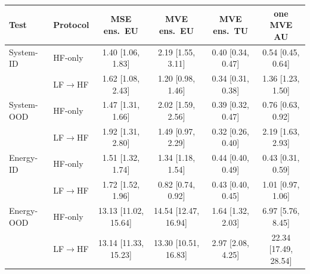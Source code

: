 \begin{tabular}{llcccc}
\toprule
Test & Protocol & MSE ens.\ EU & MVE ens.\ EU & MVE ens.\ TU & one MVE AU \\
\midrule
System-ID & HF-only & 1.40 {\scriptsize [1.06, 1.83]} & 2.19 {\scriptsize [1.55, 3.11]} & 0.40 {\scriptsize [0.34, 0.47]} & 0.54 {\scriptsize [0.45, 0.64]} \\
 & LF$\to$HF & 1.62 {\scriptsize [1.08, 2.43]} & 1.20 {\scriptsize [0.98, 1.46]} & 0.34 {\scriptsize [0.31, 0.38]} & 1.36 {\scriptsize [1.23, 1.50]} \\
\addlinespace
System-OOD & HF-only & 1.47 {\scriptsize [1.31, 1.66]} & 2.02 {\scriptsize [1.59, 2.56]} & 0.39 {\scriptsize [0.32, 0.47]} & 0.76 {\scriptsize [0.63, 0.92]} \\
 & LF$\to$HF & 1.92 {\scriptsize [1.31, 2.80]} & 1.49 {\scriptsize [0.97, 2.29]} & 0.32 {\scriptsize [0.26, 0.40]} & 2.19 {\scriptsize [1.63, 2.93]} \\
\addlinespace
Energy-ID & HF-only & 1.51 {\scriptsize [1.32, 1.74]} & 1.34 {\scriptsize [1.18, 1.54]} & 0.44 {\scriptsize [0.40, 0.49]} & 0.43 {\scriptsize [0.31, 0.59]} \\
 & LF$\to$HF & 1.72 {\scriptsize [1.52, 1.96]} & 0.82 {\scriptsize [0.74, 0.92]} & 0.43 {\scriptsize [0.40, 0.45]} & 1.01 {\scriptsize [0.97, 1.06]} \\
\addlinespace
Energy-OOD & HF-only & 13.13 {\scriptsize [11.02, 15.64]} & 14.54 {\scriptsize [12.47, 16.94]} & 1.64 {\scriptsize [1.32, 2.03]} & 6.97 {\scriptsize [5.76, 8.45]} \\
 & LF$\to$HF & 13.14 {\scriptsize [11.33, 15.23]} & 13.30 {\scriptsize [10.51, 16.83]} & 2.97 {\scriptsize [2.08, 4.25]} & 22.34 {\scriptsize [17.49, 28.54]} \\
\bottomrule
\end{tabular}
